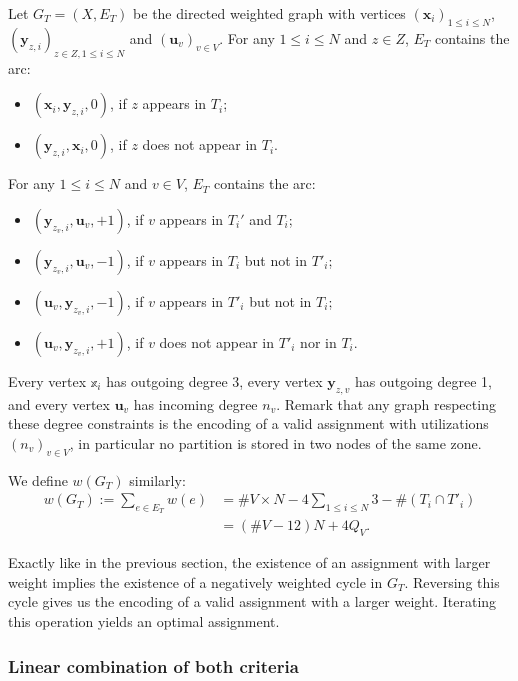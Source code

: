 \documentclass[]{article}
\begin{document}
Let $G_T=(X,E_T)$ be the directed weighted graph with vertices $(\mathbf{x}_i)_{1\le i\le N}$, $(\mathbf{y}_{z,i})_{z\in Z, 1\le i\le N}$ and $(\mathbf{u}_v)_{v\in V}$. For any $1\le i\le N$ and $z\in Z$, $E_T$ contains  the arc:
\begin{itemize}
	\item $(\mathbf{x}_i, \mathbf{y}_{z,i}, 0)$, if $z$ appears in $T_i$;
	\item $(\mathbf{y}_{z,i}, \mathbf{x}_i, 0)$, if $z$ does not appear in $T_i$.
\end{itemize}
For any $1\le i\le N$ and $v\in V$, $E_T$ contains  the arc:
\begin{itemize}
	\item $(\mathbf{y}_{z_v,i}, \mathbf{u}_v, +1)$, if $v$ appears in $T_i'$ and $T_i$;
	\item $(\mathbf{y}_{z_v,i}, \mathbf{u}_v, -1)$, if $v$ appears in $T_i$ but not in $T'_i$;
	\item $(\mathbf{u}_v, \mathbf{y}_{z_v,i}, -1)$, if $v$ appears in $T'_i$ but not in $T_i$;
	\item $(\mathbf{u}_v, \mathbf{y}_{z_v,i}, +1)$, if $v$ does not appear in $T'_i$ nor in $T_i$.
\end{itemize}
Every vertex $\mathbb{x}_i$ has outgoing degree 3, every vertex $\mathbf{y}_{z,v}$ has outgoing degree 1, and every vertex $\mathbf{u}_v$ has incoming degree $n_v$. 
Remark that any graph respecting these degree constraints is the encoding of a valid assignment with utilizations $(n_v)_{v\in V}$, in particular no partition is stored in two nodes of the same zone.

We define $w(G_T)$ similarly:
\begin{align*}
	w(G_T) := \sum_{e\in E_T} w(e) &= \#V \times N - 4\sum_{1\le i\le N} 3-\#(T_i\cap T'_i) \\
	&= (\#V-12)N + 4Q_V.
\end{align*}

Exactly like in the previous section, the existence of an assignment with larger weight implies the existence of a negatively weighted cycle in $G_T$. Reversing this cycle gives us the encoding of a valid assignment with a larger weight. Iterating this operation yields an optimal assignment.


\subsubsection{Linear combination of both criteria}
\end{document}
